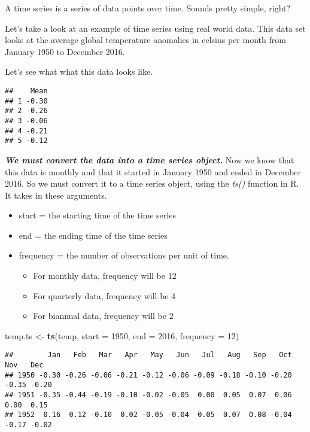 \documentclass[
]{book}
\newenvironment{Shaded}{\begin{snugshade}}{\end{snugshade}}
\newcommand{\DataTypeTok}[1]{\textcolor[rgb]{0.13,0.29,0.53}{#1}}
\newcommand{\DecValTok}[1]{\textcolor[rgb]{0.00,0.00,0.81}{#1}}
\newcommand{\KeywordTok}[1]{\textcolor[rgb]{0.13,0.29,0.53}{\textbf{#1}}}
\newcommand{\NormalTok}[1]{#1}
\newcommand{\StringTok}[1]{\textcolor[rgb]{0.31,0.60,0.02}{#1}}
\providecommand{\tightlist}{%
  \setlength{\itemsep}{0pt}\setlength{\parskip}{0pt}}
\begin{document}
A time series is a series of data points over time. Sounds pretty simple, right?

Let's take a look at an example of time series using real world data. This data set looks at the average global temperature anomalies in celsius per month from January 1950 to December 2016.

Let's see what what this data looks like.

\begin{verbatim}
##    Mean
## 1 -0.30
## 2 -0.26
## 3 -0.06
## 4 -0.21
## 5 -0.12
\end{verbatim}

\textbf{\emph{We must convert the data into a time series object.}} Now we know that this data is monthly and that it started in January 1950 and ended in December 2016. So we must convert it to a time series object, using the \emph{ts()} function in R. It takes in these arguments.

\begin{itemize}
\tightlist
\item
  start = the starting time of the time series
\item
  end = the ending time of the time series
\item
  frequency = the number of observations per unit of time.

  \begin{itemize}
  \tightlist
  \item
    For monthly data, frequency will be 12
  \item
    For quarterly data, frequency will be 4
  \item
    For biannual data, frequency will be 2
  \end{itemize}
\end{itemize}

\begin{Shaded}
\begin{Highlighting}[]
\NormalTok{temp.ts <-}\StringTok{ }\KeywordTok{ts}\NormalTok{(temp, }\DataTypeTok{start =} \DecValTok{1950}\NormalTok{, }\DataTypeTok{end =} \DecValTok{2016}\NormalTok{, }\DataTypeTok{frequency =} \DecValTok{12}\NormalTok{)}
\end{Highlighting}
\end{Shaded}

\begin{verbatim}
##        Jan   Feb   Mar   Apr   May   Jun   Jul   Aug   Sep   Oct   Nov   Dec
## 1950 -0.30 -0.26 -0.06 -0.21 -0.12 -0.06 -0.09 -0.18 -0.10 -0.20 -0.35 -0.20
## 1951 -0.35 -0.44 -0.19 -0.10 -0.02 -0.05  0.00  0.05  0.07  0.06  0.00  0.15
## 1952  0.16  0.12 -0.10  0.02 -0.05 -0.04  0.05  0.07  0.08 -0.04 -0.17 -0.02
\end{verbatim}
\end{document}
